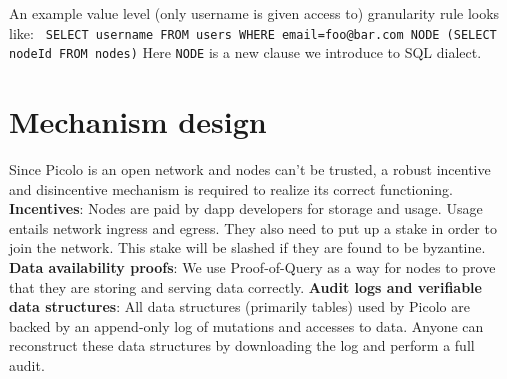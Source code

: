 \documentclass[preprint,12pt]{elsarticle}
\begin{document}
An example value level (only username is given access to) granularity rule looks like:\newline \newline
\texttt{ SELECT username \newline FROM users \newline WHERE email=foo@bar.com \newline NODE (SELECT nodeId FROM nodes)}
\newline
\newline
Here \texttt{NODE} is a new clause we introduce to SQL dialect.

\section{Mechanism design}
Since Picolo is an open network and nodes can't be trusted, a robust incentive and disincentive mechanism is required to realize its correct functioning. 
\newline
\newline
\textbf{Incentives}: Nodes are paid by dapp developers for storage and usage. Usage entails network ingress and egress. They also need to put up a stake in order to join the network. This stake will be slashed if they are found to be byzantine.
\newline
\newline
\textbf{Data availability proofs}: We use Proof-of-Query as a way for nodes to prove that they are storing and serving data correctly.
\newline
\newline
\textbf{Audit logs and verifiable data structures}: All data structures (primarily tables) used by Picolo are backed by an append-only log of mutations and accesses to data. Anyone can reconstruct these data structures by downloading the log and perform a full audit.
\end{document}
